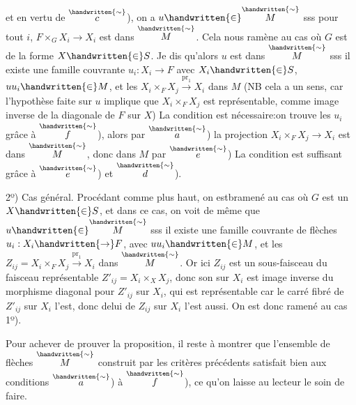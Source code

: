 
et en vertu de $\overset{\handwritten{\sim}}{c}$), on a $u\handwritten{\in} \overset{\handwritten{\sim}}{M}$ sss pour tout $i$, $F\times_G X_i\to X_i$ est dans $\overset{\handwritten{\sim}}{M}$. Cela nous ramène au cas où $G$ est de la forme $X\handwritten{\in} S$. Je dis qu'alors $u$ est dans $\overset{\handwritten{\sim}}{M}$ sss il existe une famille couvrante $u_i:X_i\to F$ avec  $X_i\handwritten{\in} S$, $uu_i\handwritten{\in} M$,  et les $X_i\times_F X_j\xrightarrow{\mathrm{pr}_1}X_i$ dans $M$ (NB cela a un sens, car l'hypothèse faite sur $u$ implique que $X_i\times_F X_j$ est représentable, comme image inverse  de la diagonale de $F$ sur $X$) La condition est nécessaire:\deleted{\unsure{=|:}}on trouve les $u_i$ grâce à $\overset{\handwritten{\sim}}{f}$), alors par $\overset{\handwritten{\sim}}{a}$) la projection $X_i\times_F X_j\to X_i$ est dans $\overset{\handwritten{\sim}}{M}$, donc dans $M$ par $\overset{\handwritten{\sim}}{e}$) La condition est suffisant grâce à $\overset{\handwritten{\sim}}{e}$) et $\overset{\handwritten{\sim}}{d}$).

2º) Cas général. Procédant comme plus haut, on estbramené au cas où $G$ est un $X\handwritten{\in} S$, et dans ce cas, on voit de même que $u\handwritten{\in} \overset{\handwritten{\sim}}{M}$ sss il existe une famille couvrante de flèches $u_i:X_i\handwritten{\to} F$, avec $uu_i\handwritten{\in} M$, et les $Z_{ij}=X_i\times_F X_j\xrightarrow{\mathrm{pr}_1}X_i$ dans $\overset{\handwritten{\sim}}{M}$. Or ici $Z_{ij}$ est un sous-faisceau du faisceau représentable $Z'_{ij}=X_i\times_X X_j$, donc son  sur $X_i$ est image inverse du morphisme diagonal pour $Z'_{ij}$ sur $X_i$, qui est représentable car le carré fibré de $Z'_{ij}$ sur $X_i$ l'est, donc delui de $Z_{ij}$ sur $X_i$ l'est aussi. On est donc ramené au cas 1º).

Pour achever de prouver la proposition, il reste à montrer que l'ensemble de flèches $\overset{\handwritten{\sim}}{M}$ construit par les critères précédents satisfait bien aux conditions $\overset{\handwritten{\sim}}{a}$) à $\overset{\handwritten{\sim}}{f}$), ce qu'on laisse au lecteur le soin de faire.

